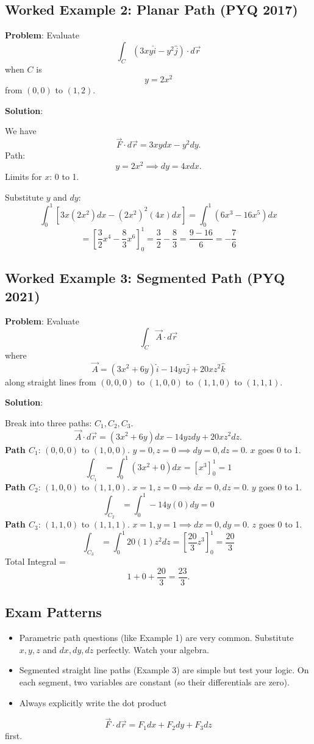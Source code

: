 \documentclass[
]{article}
\providecommand{\tightlist}{%
  \setlength{\itemsep}{0pt}\setlength{\parskip}{0pt}}
\begin{document}
\subsection{Worked Example 2: Planar Path (PYQ
2017)}\label{worked-example-2-planar-path-pyq-2017}

\textbf{Problem}: Evaluate
\[
\int_C (3xy\hat{i} - y^2\hat{j}) \cdot d\vec{r}
\]
when \(C\) is
\[
y = 2x^2
\]
from \((0,0)\) to \((1,2)\).

\textbf{Solution}:

We have
\[
\vec{F} \cdot d\vec{r} = 3xy dx - y^2 dy.
\]
Path:
\[
y = 2x^2 \implies dy = 4x dx.
\]
Limits for \(x\): 0 to 1.

Substitute \(y\) and \(dy\):
\[
\int_0^1 \left[ 3x(2x^2)dx - (2x^2)^2(4x)dx \right] = \int_0^1 (6x^3 - 16x^5) dx
\]
\[
= \left[ \frac{3}{2}x^4 - \frac{8}{3}x^6 \right]_0^1 = \frac{3}{2} - \frac{8}{3} = \frac{9 - 16}{6} = -\frac{7}{6}
\]

\subsection{Worked Example 3: Segmented Path (PYQ
2021)}\label{worked-example-3-segmented-path-pyq-2021}

\textbf{Problem}: Evaluate
\[
\int_C \vec{A} \cdot d\vec{r}
\]
where
\[
\vec{A} = (3x^2 + 6y)\hat{i} - 14yz\hat{j} + 20xz^2\hat{k}
\]
along straight lines from \((0,0,0)\) to \((1,0,0)\) to \((1,1,0)\) to
\((1,1,1)\).

\textbf{Solution}:

Break into three paths: \(C_1, C_2, C_3\).
\[
\vec{A} \cdot d\vec{r} = (3x^2 + 6y)dx - 14yz dy + 20xz^2 dz.
\]
\textbf{Path \(C_1\)}: \((0,0,0)\) to \((1,0,0)\).
\(y=0, z=0 \implies dy=0, dz=0\). \(x\) goes 0 to 1.
\[
\int_{C_1} = \int_0^1 (3x^2 + 0) dx = [x^3]_0^1 = 1
\]
\textbf{Path \(C_2\)}: \((1,0,0)\) to \((1,1,0)\).
\(x=1, z=0 \implies dx=0, dz=0\). \(y\) goes 0 to 1.
\[
\int_{C_2} = \int_0^1 -14y(0) dy = 0
\]
\textbf{Path \(C_3\)}: \((1,1,0)\) to \((1,1,1)\).
\(x=1, y=1 \implies dx=0, dy=0\). \(z\) goes 0 to 1.
\[
\int_{C_3} = \int_0^1 20(1)z^2 dz = \left[\frac{20}{3}z^3\right]_0^1 = \frac{20}{3}
\]
Total Integral =
\[
1 + 0 + \frac{20}{3} = \frac{23}{3}.
\]

\subsection{Exam Patterns}\label{exam-patterns-11}

\begin{itemize}
\tightlist
\item
  Parametric path questions (like Example 1) are very common. Substitute
  \(x, y, z\) and \(dx, dy, dz\) perfectly. Watch your algebra.
\item
  Segmented straight line paths (Example 3) are simple but test your
  logic. On each segment, two variables are constant (so their
  differentials are zero).
\item
  Always explicitly write the dot product
\end{itemize}
\[
\vec{F} \cdot d\vec{r} = F_1 dx + F_2 dy + F_3 dz
\]
first.
\end{document}
